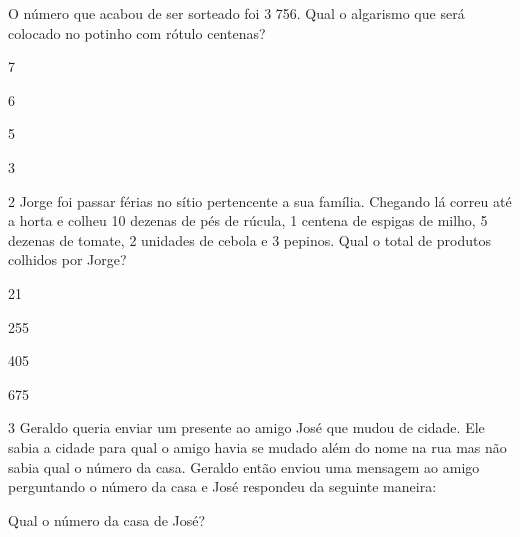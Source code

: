O número que acabou de ser sorteado foi 3 756. Qual o algarismo que será
colocado no potinho com rótulo centenas?

\begin{escolha}
\item
  7
\item
  6
\item
  5
\item
  3
\end{escolha}


\num{2} Jorge foi passar férias no sítio pertencente a sua família.
Chegando lá correu até a horta e colheu 10 dezenas de pés de rúcula, 1
centena de espigas de milho, 5 dezenas de tomate, 2 unidades de cebola e
3 pepinos. Qual o total de produtos colhidos por Jorge?

\begin{escolha}
\item
  21
\item
  255
\item
  405
\item
  675
\end{escolha}


\num{3} Geraldo queria enviar um presente ao amigo José que mudou de
cidade. Ele sabia a cidade para qual o amigo havia se mudado além do
nome na rua mas não sabia qual o número da casa. Geraldo então enviou
uma mensagem ao amigo perguntando o número da casa e José respondeu da
seguinte maneira:


Qual o número da casa de José?

